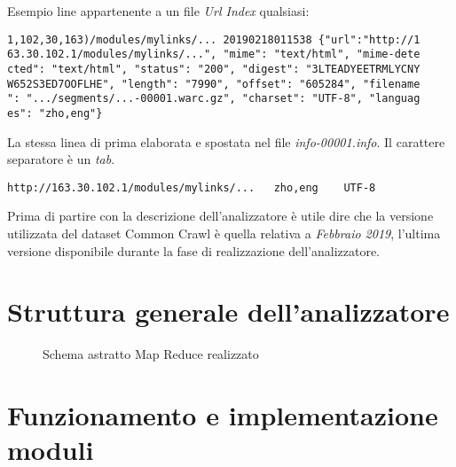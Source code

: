 \documentclass{article}
\newcommand{\CC}{Common Crawl }
\newcommand{\filename}[1]{\textit{#1}}
\begin{document}
Esempio line appartenente a un file \textit{Url Index} qualsiasi:
\begin{verbatim}
1,102,30,163)/modules/mylinks/... 20190218011538 {"url":"http://1
63.30.102.1/modules/mylinks/...", "mime": "text/html", "mime-dete
cted": "text/html", "status": "200", "digest": "3LTEADYEETRMLYCNY
W652S3ED7OOFLHE", "length": "7990", "offset": "605284", "filename
": ".../segments/...-00001.warc.gz", "charset": "UTF-8", "languag
es": "zho,eng"}
\end{verbatim}
La stessa linea di prima elaborata e spostata nel file \filename{info-00001.info}. Il carattere separatore è un \textit{tab}.
\begin{verbatim}
http://163.30.102.1/modules/mylinks/...   zho,eng    UTF-8 
\end{verbatim}

Prima di partire con la descrizione dell'analizzatore è utile dire che la versione utilizzata del dataset \CC è quella relativa a \textit{Febbraio 2019}, l'ultima versione disponibile durante la fase di realizzazione dell'analizzatore. 

\section{Struttura generale dell'analizzatore}
\begin{figure}[H]
  \centering
  
  \caption{Schema astratto Map Reduce realizzato}
\end{figure}

\section{Funzionamento e implementazione moduli}
\end{document}
